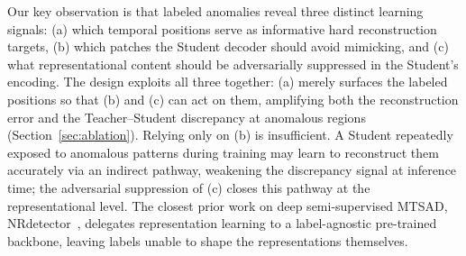Our key observation is that labeled anomalies reveal three distinct learning signals: (a) which temporal positions serve as informative hard reconstruction targets, (b) which patches the Student decoder should avoid mimicking, and (c) what representational content should be adversarially suppressed in the Student's encoding.
The design exploits all three together: (a) merely surfaces the labeled positions so that (b) and (c) can act on them, amplifying both the reconstruction error and the Teacher--Student discrepancy at anomalous regions (Section~\ref{sec:ablation}).
Relying only on (b) is insufficient.
A Student repeatedly exposed to anomalous patterns during training may learn to reconstruct them accurately via an indirect pathway, weakening the discrepancy signal at inference time; the adversarial suppression of (c) closes this pathway at the representational level.
The closest prior work on deep semi-supervised MTSAD, NRdetector~\cite{wang2025nrdetector}, delegates representation learning to a label-agnostic pre-trained backbone, leaving labels unable to shape the representations themselves.

